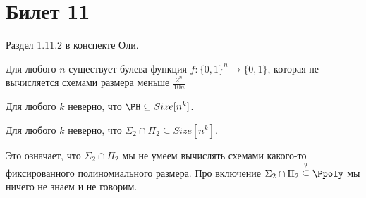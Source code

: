 \setcounter{section}{10}
\section{Билет 11}
	Раздел 1.11.2 в конспекте Оли.

	\begin{theorem}
		Для любого $n$ существует булева функция $f \colon \{0, 1\}^n \to \{0, 1\}$, которая
		не вычисляется схемами размера меньше $\frac{2^n}{10n}$
	\end{theorem}
	\begin{theorem}
		Для любого $k$ неверно, что $\PH \subseteq Size[n^k]$.
	\end{theorem}
	\begin{theorem}
		Для любого $k$ неверно, что $\Sigma_2 \cap \Pi_2 \subseteq Size[n^k]$.
	\end{theorem}
	\begin{Rem}
		Это означает, что $\Sigma_2 \cap \Pi_2$ мы не умеем вычислять схемами какого-то фиксированного
		полиномиального размера.
		Про включение $\Sigma_2 \cap \Pi_2 \stackrel{?}{\subseteq} \Ppoly$ мы ничего не знаем и не говорим.
	\end{Rem}
